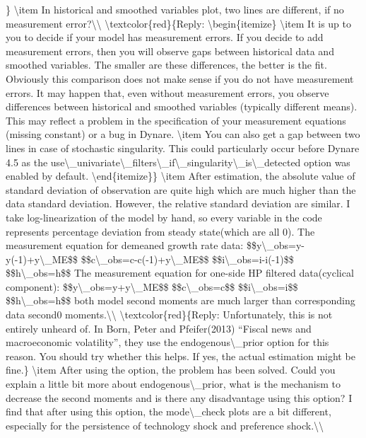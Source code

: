 \documentclass[10pt,math=newtx,citestyle=gb7714-2015,bibstyle=gb7714-2015]{elegantbook}
\begin{document}
	\}
	\textbackslash{}item In historical and smoothed variables plot, two lines are different, if no measurement error?\textbackslash{}\textbackslash{}
	\textbackslash{}textcolor\{red\}\{Reply:
	\textbackslash{}begin\{itemize\}
	\textbackslash{}item It is up to you to decide if your model has measurement errors. If you decide to add measurement errors, then you will observe gaps between historical data and smoothed variables. The smaller are these differences, the better is the fit. Obviously this comparison does not make sense if you do not have measurement errors. It may happen that, even without measurement errors, you observe differences between historical and smoothed variables (typically different means). This may reflect a problem in the specification of your measurement equations (missing constant) or a bug in Dynare.
	\textbackslash{}item You can also get a gap between two lines in case of stochastic singularity. This could particularly occur before Dynare 4.5 as the use\textbackslash{}\_univariate\textbackslash{}\_filters\textbackslash{}\_if\textbackslash{}\_singularity\textbackslash{}\_is\textbackslash{}\_detected option was enabled by default.
	\textbackslash{}end\{itemize\}\}
	\textbackslash{}item After estimation, the absolute value of standard deviation of observation are quite high which are much higher than the data standard deviation. However, the relative standard deviation are similar. I take log-linearization of the model by hand, so every variable in the code represents percentage deviation from steady state(which are all 0). The measurement equation for demeaned growth rate data:
	\$\$y\textbackslash{}\_obs=y-y(-1)+y\textbackslash{}\_ME\$\$
	\$\$c\textbackslash{}\_obs=c-c(-1)+y\textbackslash{}\_ME\$\$
	\$\$i\textbackslash{}\_obs=i-i(-1)\$\$
	\$\$h\textbackslash{}\_obs=h\$\$
	The measurement equation for one-side HP  filtered data(cyclical component):
	\$\$y\textbackslash{}\_obs=y+y\textbackslash{}\_ME\$\$
	\$\$c\textbackslash{}\_obs=c\$\$
	\$\$i\textbackslash{}\_obs=i\$\$
	\$\$h\textbackslash{}\_obs=h\$\$
	both model second moments are much larger than corresponding data second0 moments.\textbackslash{}\textbackslash{}
	\textbackslash{}textcolor\{red\}\{Reply: Unfortunately, this is not entirely unheard of. In Born, Peter and Pfeifer(2013) ``Fiscal news and macroeconomic volatility'', they use the endogenous\textbackslash{}\_prior option for this reason. You should  try whether this helps. If yes, the actual estimation might be fine.\}
	\textbackslash{}item After using the option, the problem has been solved. Could you explain a little bit more about endogenous\textbackslash{}\_prior, what is the mechanism to decrease the second moments and is there any disadvantage using this option? I find that after using this option, the mode\textbackslash{}\_check plots are a bit different, especially for the persistence of technology shock and preference shock.\textbackslash{}\textbackslash{}
\end{document}
